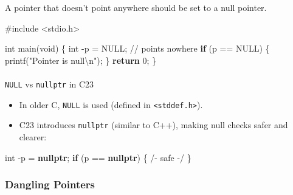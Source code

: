 \documentclass[
  letterpaper,
  DIV=11,
  numbers=noendperiod]{scrreprt}
\makeatletter
\let\oldparagraph\paragraph
\renewcommand{\paragraph}{
    \@ifstar
      \xxxParagraphStar
      \xxxParagraphNoStar
  }
\newcommand{\xxxParagraphStar}[1]{\oldparagraph*{#1}\mbox{}}
\newcommand{\xxxParagraphNoStar}[1]{\oldparagraph{#1}\mbox{}}
\newenvironment{Shaded}{\begin{snugshade}}{\end{snugshade}}
\newcommand{\CommentTok}[1]{\textcolor[rgb]{0.37,0.37,0.37}{#1}}
\newcommand{\ControlFlowTok}[1]{\textcolor[rgb]{0.00,0.23,0.31}{\textbf{#1}}}
\newcommand{\DataTypeTok}[1]{\textcolor[rgb]{0.68,0.00,0.00}{#1}}
\newcommand{\DecValTok}[1]{\textcolor[rgb]{0.68,0.00,0.00}{#1}}
\newcommand{\ImportTok}[1]{\textcolor[rgb]{0.00,0.46,0.62}{#1}}
\newcommand{\KeywordTok}[1]{\textcolor[rgb]{0.00,0.23,0.31}{\textbf{#1}}}
\newcommand{\NormalTok}[1]{\textcolor[rgb]{0.00,0.23,0.31}{#1}}
\newcommand{\OperatorTok}[1]{\textcolor[rgb]{0.37,0.37,0.37}{#1}}
\newcommand{\PreprocessorTok}[1]{\textcolor[rgb]{0.68,0.00,0.00}{#1}}
\newcommand{\SpecialCharTok}[1]{\textcolor[rgb]{0.37,0.37,0.37}{#1}}
\newcommand{\StringTok}[1]{\textcolor[rgb]{0.13,0.47,0.30}{#1}}
\providecommand{\tightlist}{%
  \setlength{\itemsep}{0pt}\setlength{\parskip}{0pt}}
\makeatother
\begin{document}
A pointer that doesn't point anywhere should be set to a null pointer.

\begin{Shaded}
\begin{Highlighting}[]
\PreprocessorTok{\#include }\ImportTok{\textless{}stdio.h\textgreater{}}

\DataTypeTok{int}\NormalTok{ main}\OperatorTok{(}\DataTypeTok{void}\OperatorTok{)} \OperatorTok{\{}
    \DataTypeTok{int} \OperatorTok{{-}}\NormalTok{p }\OperatorTok{=}\NormalTok{ NULL}\OperatorTok{;}   \CommentTok{// points nowhere}
    \ControlFlowTok{if} \OperatorTok{(}\NormalTok{p }\OperatorTok{==}\NormalTok{ NULL}\OperatorTok{)} \OperatorTok{\{}
\NormalTok{        printf}\OperatorTok{(}\StringTok{"Pointer is null}\SpecialCharTok{\textbackslash{}n}\StringTok{"}\OperatorTok{);}
    \OperatorTok{\}}
    \ControlFlowTok{return} \DecValTok{0}\OperatorTok{;}
\OperatorTok{\}}
\end{Highlighting}
\end{Shaded}

\paragraph{\texorpdfstring{\texttt{NULL} vs \texttt{nullptr} in
C23}{NULL vs nullptr in C23}}\label{null-vs-nullptr-in-c23}

\begin{itemize}
\tightlist
\item
  In older C, \texttt{NULL} is used (defined in
  \texttt{\textless{}stddef.h\textgreater{}}).
\item
  C23 introduces \texttt{nullptr} (similar to C++), making null checks
  safer and clearer:
\end{itemize}

\begin{Shaded}
\begin{Highlighting}[]
\DataTypeTok{int} \OperatorTok{{-}}\NormalTok{p }\OperatorTok{=} \KeywordTok{nullptr}\OperatorTok{;}
\ControlFlowTok{if} \OperatorTok{(}\NormalTok{p }\OperatorTok{==} \KeywordTok{nullptr}\OperatorTok{)} \OperatorTok{\{} \OperatorTok{/{-}}\NormalTok{ safe }\OperatorTok{{-}/} \OperatorTok{\}}
\end{Highlighting}
\end{Shaded}

\subsubsection{Dangling Pointers}\label{dangling-pointers}
\end{document}
